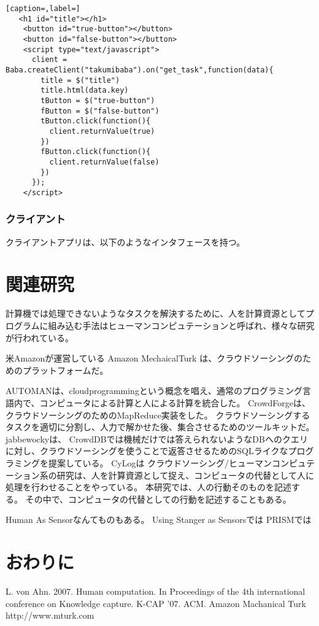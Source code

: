 \documentclass{deimj}
\begin{document}
\begin{lstlisting}[caption=,label=]
   <h1 id="title"></h1>
    <button id="true-button"></button>
    <button id="false-button"></button>
    <script type="text/javascript">
      client = Baba.createClient("takumibaba").on("get_task",function(data){
        title = $("title")
        title.html(data.key)
        tButton = $("true-button")
        fButton = $("false-button")
        tButton.click(function(){
          client.returnValue(true)
        })
        fButton.click(function(){
          client.returnValue(false)
        })
      });
    </script>
\end{lstlisting}
    
  
\subsubsection{クライアント}
クライアントアプリは、以下のようなインタフェースを持つ。

\section{関連研究}
計算機では処理できないようなタスクを解決するために、人を計算資源としてプログラムに組み込む手法はヒューマンコンピュテーション\cite{HumanComputation}と呼ばれ、様々な研究が行われている。

米Amazonが運営している Amazon MechaicalTurk\cite{amt} は、クラウドソーシングのためのプラットフォームだ。

AUTOMAN\cite{automan}は、cloudprogrammingという概念を唱え、通常のプログラミング言語内で、コンピュータによる計算と人による計算を統合した。
CrowdForge\cite{crowdforge}は、クラウドソーシングのためのMapReduce実装をした。
クラウドソーシングするタスクを適切に分割し、人力で解かせた後、集合させるためのツールキットだ。
jabbewocky\cite{jabberwocky}は、
CrowdDB\cite{crowddb}では機械だけでは答えられないようなDBへのクエリに対し、クラウドソーシングを使うことで返答させるためのSQLライクなプログラミングを提案している。
CyLog\cite{cylog}は
クラウドソーシング/ヒューマンコンピュテーション系の研究は、人を計算資源として捉え、コンピュータの代替として人に処理を行わせることをやっている。
本研究では、人の行動そのものを記述する。
その中で、コンピュータの代替としての行動を記述することもある。

Human As Sensorなんてものもある。
Using Stanger as Sensorsでは
PRISMでは

\section{おわりに}

\vspace{30mm}

\begin{thebibliography}{99}
L. von Ahn. 2007. Human computation. In Proceedings of the 4th international conference on Knowledge capture. K-CAP '07. ACM.
Amazon Machanical Turk
http://www.mturk.com
\end{thebibliography}
\end{document}
